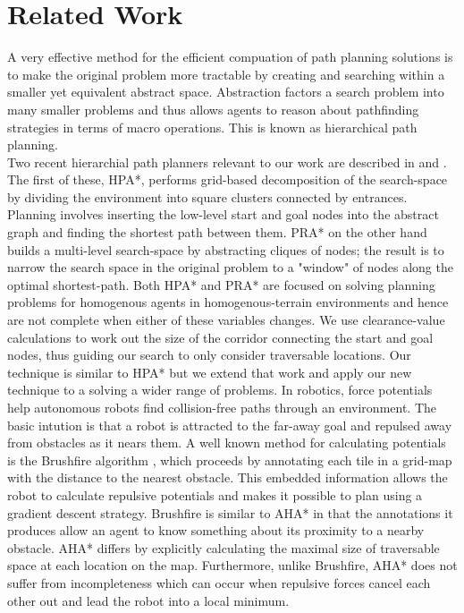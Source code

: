 \section{Related Work}
A very effective method for the efficient compuation of path planning solutions is to make the original problem more tractable by creating and searching within a smaller yet equivalent abstract space. Abstraction factors a search problem into many smaller problems and thus allows agents to reason about pathfinding strategies in terms of macro operations. This is known as hierarchical path planning. \\ \newline
Two recent hierarchial path planners relevant to our work are described in \cite{botea04} and \cite{sturtevant05}. The first of these, HPA*, performs grid-based decomposition of the search-space by dividing the environment into square clusters connected by entrances. Planning involves inserting the low-level start and goal nodes into the abstract graph and finding the shortest path between them. 
PRA* on the other hand builds a multi-level search-space by abstracting cliques of nodes; the result is to narrow the search space in the original problem to a "window" of nodes along the optimal shortest-path.\newline
Both HPA* and PRA* are focused on solving planning problems for homogenous agents in homogenous-terrain environments and hence are not complete when either of these variables changes. 
We use clearance-value calculations to work out the size of the corridor connecting the start and goal nodes, thus guiding our search to only consider traversable locations. 
Our technique is similar to HPA* but we extend that work and apply our new technique to a solving a wider range of problems. 
\medskip
In robotics, force potentials help autonomous robots find collision-free paths through an environment. The basic intution is that a robot is attracted to the far-away goal and repulsed away from obstacles as it nears them. A well known method for calculating potentials is the Brushfire algorithm \cite{latombe91}, which proceeds by annotating each tile in a grid-map with the distance to the nearest obstacle. This embedded information allows the robot to calculate repulsive potentials and makes it possible to plan using a gradient descent strategy. \newline
Brushfire is similar to AHA* in that the annotations it produces allow an agent to know something about its proximity to a nearby obstacle. AHA* differs by explicitly calculating the maximal size of traversable space at each location on the map. Furthermore, unlike Brushfire, AHA* does not suffer from incompleteness which can occur when repulsive forces cancel each other out and lead the robot into a local minimum.
